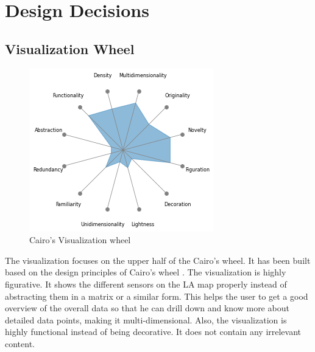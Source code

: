 \documentclass{llncs}
\begin{document}

\section{Design Decisions}\label{sec:Design}

\subsection {Visualization Wheel}\label{sec:Visualization Wheel}

\begin{figure}[h!]
	\centering
   \vspace{-10pt}
	 \hspace*{-0.5in}
   \includegraphics[scale=0.5]{vis_wheel.png}
   \caption{Cairo's Visualization wheel}
   \label{fig:cclogo}
\end{figure}



The visualization focuses on the upper half of the Cairo's wheel. It has been built based on the design principles of Cairo's wheel \cite{Cairo2012}. The visualization is highly figurative. It shows the different sensors on the LA map properly instead of abstracting them in a matrix or a similar form. This helps the user to get a good overview of the overall data so that he can drill down and know more about detailed data points, making it multi-dimensional. Also, the visualization is highly functional instead of being decorative. It does not contain any irrelevant content. 
\end{document}
